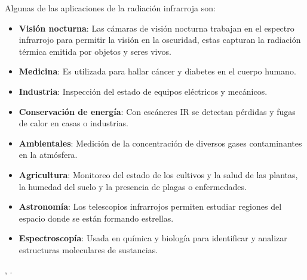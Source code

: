             \begin{table}[htbp]
                \caption{División de la radiación infrarroja\cite{Rogalski}}
                \begin{center}
                \label{tab:Div_IR}
                \end{center}
            \end{table}
            
            \newpage
            
Algunas de las aplicaciones de la radiación infrarroja son:
			\begin{itemize}
				\item \textbf{Visión nocturna}: Las cámaras de visión nocturna trabajan en el espectro infrarrojo para permitir la visión en la oscuridad, estas capturan la radiación térmica emitida por objetos y seres vivos.
				\item \textbf{Medicina}: Es utilizada para hallar cáncer y diabetes en el cuerpo humano.
				\item \textbf{Industria}: Inspección del estado de equipos eléctricos y mecánicos.
				\item \textbf{Conservación de energía}: Con escáneres IR se detectan pérdidas y fugas de calor en casas o industrias.
				\item \textbf{Ambientales}: Medición de la concentración de diversos gases contaminantes en la atmósfera.
				\item \textbf{Agricultura}: Monitoreo del estado de los cultivos y la salud de las plantas, la humedad del suelo y la presencia de plagas o enfermedades.
				\item \textbf{Astronomía}: Los telescopios infrarrojos permiten estudiar regiones del espacio donde se están formando estrellas.
				\item \textbf{Espectroscopía}: Usada en química y biología para identificar y analizar estructuras moleculares de sustancias.		
			\end{itemize}
\cite{Rogalski}, \cite{BlancoMDA}.

